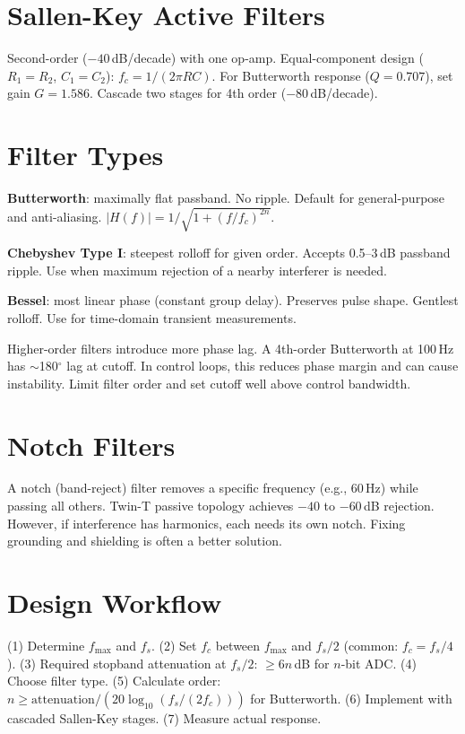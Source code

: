 \documentclass[11pt,letterpaper,twoside,openany]{book}
\begin{document}
\section{Sallen-Key Active Filters}
Second-order ($-40$\,dB/decade) with one op-amp. Equal-component design ($R_1 = R_2$, $C_1 = C_2$): $f_c = 1/(2\pi RC)$. For Butterworth response ($Q = 0.707$), set gain $G = 1.586$. Cascade two stages for 4th order ($-80$\,dB/decade).

\section{Filter Types}
\textbf{Butterworth}: maximally flat passband. No ripple. Default for general-purpose and anti-aliasing. $|H(f)| = 1/\sqrt{1+(f/f_c)^{2n}}$.

\textbf{Chebyshev Type I}: steepest rolloff for given order. Accepts 0.5--3\,dB passband ripple. Use when maximum rejection of a nearby interferer is needed.

\textbf{Bessel}: most linear phase (constant group delay). Preserves pulse shape. Gentlest rolloff. Use for time-domain transient measurements.

\begin{warningbox}
Higher-order filters introduce more phase lag. A 4th-order Butterworth at 100\,Hz has $\sim$180$^\circ$ lag at cutoff. In control loops, this reduces phase margin and can cause instability. Limit filter order and set cutoff well above control bandwidth.
\end{warningbox}

\section{Notch Filters}
A notch (band-reject) filter removes a specific frequency (e.g., 60\,Hz) while passing all others. Twin-T passive topology achieves $-40$ to $-60$\,dB rejection. However, if interference has harmonics, each needs its own notch. Fixing grounding and shielding is often a better solution.

\section{Design Workflow}
(1) Determine $f_{\max}$ and $f_s$. (2) Set $f_c$ between $f_{\max}$ and $f_s/2$ (common: $f_c = f_s/4$). (3) Required stopband attenuation at $f_s/2$: $\geq 6n$\,dB for $n$-bit ADC. (4) Choose filter type. (5) Calculate order: $n \geq \text{attenuation}/(20\log_{10}(f_s/(2f_c)))$ for Butterworth. (6) Implement with cascaded Sallen-Key stages. (7) Measure actual response.
\end{document}

